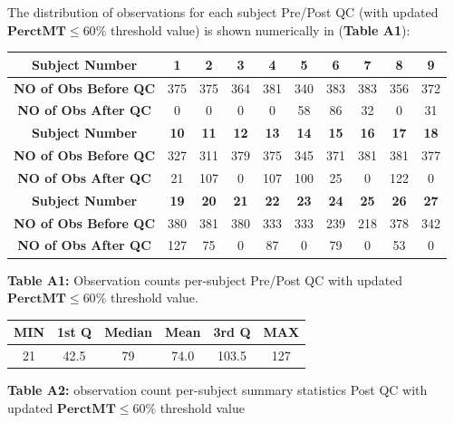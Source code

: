 \documentclass[12pt,]{article}
\begin{document}
The distribution of observations for each subject Pre/Post QC (with
updated \newline \(\mathbf{PerctMT} \leq 60 \%\) threshold value) is
shown numerically in (\textbf{Table A1}):

\vspace{5pt}
\begin{center}
\begin{tabular}{|c||c|c|c|c|c|c|c|c|c|}
\hline
\textbf{Subject Number} & \textbf{1} & \textbf{2} & \textbf{3} & \textbf{4} & \textbf{5} & \textbf{6} & \textbf{7} & \textbf{8} & \textbf{9}  \\
\hline
\hline
\textbf{NO of Obs Before QC} & 375 & 375 & 364 & 381 & 340 & 383 & 383 & 356 & 372 \\
\hline
\textbf{NO of Obs After QC} & 0 & 0 & 0 & 0 & 58 & 86 & 32 & 0 & 31 \\
\hline
\hline
\textbf{Subject Number} & \textbf{10} & \textbf{11} & \textbf{12} & \textbf{13} & \textbf{14} & \textbf{15} & \textbf{16} & \textbf{17} & \textbf{18}  \\
\hline
\hline
\textbf{NO of Obs Before QC}  & 327 & 311 & 379 & 375 & 345 & 371 & 381 & 381 & 377 \\
\hline
\textbf{NO of Obs After QC} & 21 & 107 & 0 & 107 & 100 & 25 & 0 & 122 & 0 \\
\hline
\hline
\textbf{Subject Number} & \textbf{19} & \textbf{20} & \textbf{21} & \textbf{22} & \textbf{23} & \textbf{24} & \textbf{25} & \textbf{26} & \textbf{27}  \\
\hline
\hline
\textbf{NO of Obs Before QC} & 380 & 381 & 380 & 333 & 333 & 239 & 218 & 378 & 342 \\
\hline
\textbf{NO of Obs After QC} & 127 & 75 & 0 & 87 & 0 & 79 & 0 & 53 & 0 \\
\hline
\end{tabular}
\end{center}
\vspace{5pt}

\begin{center}
\textbf{Table A1:} Observation counts per-subject Pre/Post QC with updated $\mathbf{PerctMT} \leq 60 \%$ threshold value.
\end{center}

\vspace{5pt}

\begin{center}
\begin{tabular}{|c|c|c|c|c|c|}
\hline
MIN & 1st Q & Median & Mean & 3rd Q & MAX \\
\hline
21 & 42.5 & 79 & 74.0 & 103.5 & 127 \\
\hline
\end{tabular}

\vspace{5pt}

\textbf{Table A2:} observation count per-subject summary statistics Post QC with updated $\mathbf{PerctMT} \leq 60 \%$ threshold value
\end{center}
\end{document}
